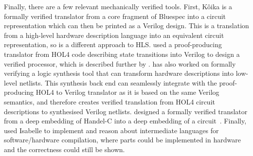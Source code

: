 Finally, there are a few relevant mechanically verified tools.  First, K\^{o}ika
is a formally verified translator from a core fragment of Bluespec into a
circuit representation which can then be printed as a Verilog design.  This is a
translation from a high-level hardware description language into an equivalent
circuit representation, so is a different approach to HLS.
\textcite{lööw19_proof_trans_veril_devel_hol} used a proof-producing translator
from HOL4 code describing state transitions into Verilog to design a verified
processor, which is described further by
\textcite{lööw19_verif_compil_verif_proces}. \textcite{lööw21_lutsig} has also
worked on formally verifying a logic synthesis tool that can transform hardware
descriptions into low-level netlists.  This synthesis back end can seamlessly
integrate with the proof-producing HOL4 to Verilog translator as it is based on
the same Verilog semantics, and therefore creates verified translation from HOL4
circuit descriptions to synthesised Verilog netlists.
\citeauthor{perna12_mechan_wire_wise_verif_handel_c_synth} designed a formally
verified translator from a deep embedding of Handel-C into a deep embedding of a
circuit~\cite{perna12_mechan_wire_wise_verif_handel_c_synth,perna11_correc_hardw_synth}.
Finally, \textcite{ellis08_csicgfu} used Isabelle to implement and reason about
intermediate languages for software/hardware compilation, where parts could be
implemented in hardware and the correctness could still be shown.

